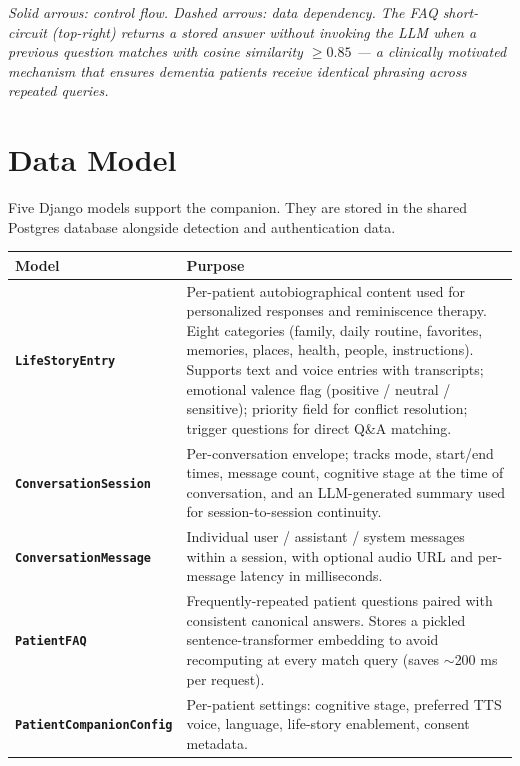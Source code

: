 \documentclass[11pt, a4paper]{article}
\begin{document}
\begin{center}
\end{center}

\textit{Solid arrows: control flow. Dashed arrows: data dependency. The FAQ short-circuit (top-right) returns a stored answer without invoking the LLM when a previous question matches with cosine similarity $\geq 0.85$ --- a clinically motivated mechanism that ensures dementia patients receive identical phrasing across repeated queries.}

\section{Data Model}

Five Django models support the companion. They are stored in the shared Postgres database alongside detection and authentication data.

\begin{center}
\small
\begin{tabular}{>{\bfseries}p{3.5cm} p{12.6cm}}
\toprule
Model & Purpose \\
\midrule
\texttt{LifeStoryEntry} & Per-patient autobiographical content used for personalized responses and reminiscence therapy. Eight categories (family, daily routine, favorites, memories, places, health, people, instructions). Supports text and voice entries with transcripts; emotional valence flag (positive / neutral / sensitive); priority field for conflict resolution; trigger questions for direct Q\&A matching. \\
\texttt{ConversationSession} & Per-conversation envelope; tracks mode, start/end times, message count, cognitive stage at the time of conversation, and an LLM-generated summary used for session-to-session continuity. \\
\texttt{ConversationMessage} & Individual user / assistant / system messages within a session, with optional audio URL and per-message latency in milliseconds. \\
\texttt{PatientFAQ} & Frequently-repeated patient questions paired with consistent canonical answers. Stores a pickled sentence-transformer embedding to avoid recomputing at every match query (saves $\sim$200 ms per request). \\
\texttt{PatientCompanionConfig} & Per-patient settings: cognitive stage, preferred TTS voice, language, life-story enablement, consent metadata. \\
\bottomrule
\end{tabular}
\end{center}
\end{document}
